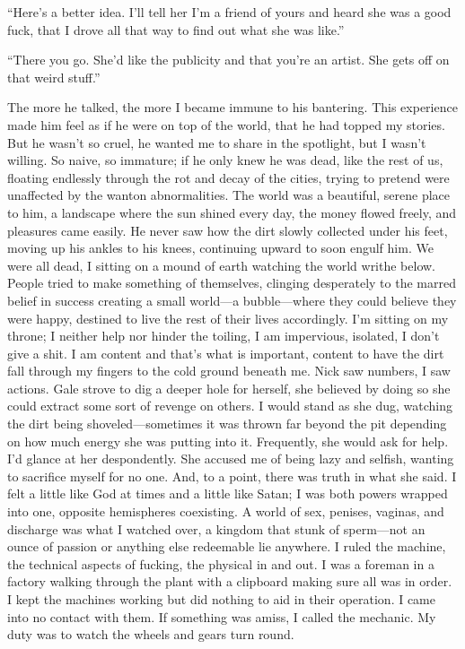 ``Here's a better idea. I'll tell her I'm a friend of yours and heard
she was a good fuck, that I drove all that way to find out what she was
like.''

``There you go. She'd like the publicity and that you're an artist. She
gets off on that weird stuff.''

The more he talked, the more I became immune to his bantering. This
experience made him feel as if he were on top of the world, that he had
topped my stories. But he wasn't so cruel, he wanted me to share in the
spotlight, but I wasn't willing. So naive, so immature; if he only knew
he was dead, like the rest of us, floating endlessly through the rot and
decay of the cities, trying to pretend were unaffected by the wanton
abnormalities. The world was a beautiful, serene place to him, a
landscape where the sun shined every day, the money flowed freely, and
pleasures came easily. He never saw how the dirt slowly collected under
his feet, moving up his ankles to his knees, continuing upward to soon
engulf him. We were all dead, I sitting on a mound of earth watching the
world writhe below. People tried to make something of themselves,
clinging desperately to the marred belief in success creating a small
world---a bubble---where they could believe they were happy, destined to
live the rest of their lives accordingly. I'm sitting on my throne; I
neither help nor hinder the toiling, I am impervious, isolated, I don't
give a shit. I am content and that's what is important, content to have
the dirt fall through my fingers to the cold ground beneath me. Nick saw
numbers, I saw actions. Gale strove to dig a deeper hole for herself,
she believed by doing so she could extract some sort of revenge on
others. I would stand as she dug, watching the dirt being
shoveled---sometimes it was thrown far beyond the pit depending on how
much energy she was putting into it. Frequently, she would ask for help.
I'd glance at her despondently. She accused me of being lazy and
selfish, wanting to sacrifice myself for no one. And, to a point, there
was truth in what she said. I felt a little like God at times and a
little like Satan; I was both powers wrapped into one, opposite
hemispheres coexisting. A world of sex, penises, vaginas, and discharge
was what I watched over, a kingdom that stunk of sperm---not an ounce of
passion or anything else redeemable lie anywhere. I ruled the machine,
the technical aspects of fucking, the physical in and out. I was a
foreman in a factory walking through the plant with a clipboard making
sure all was in order. I kept the machines working but did nothing to
aid in their operation. I came into no contact with them. If something
was amiss, I called the mechanic. My duty was to watch the wheels and
gears turn round.

